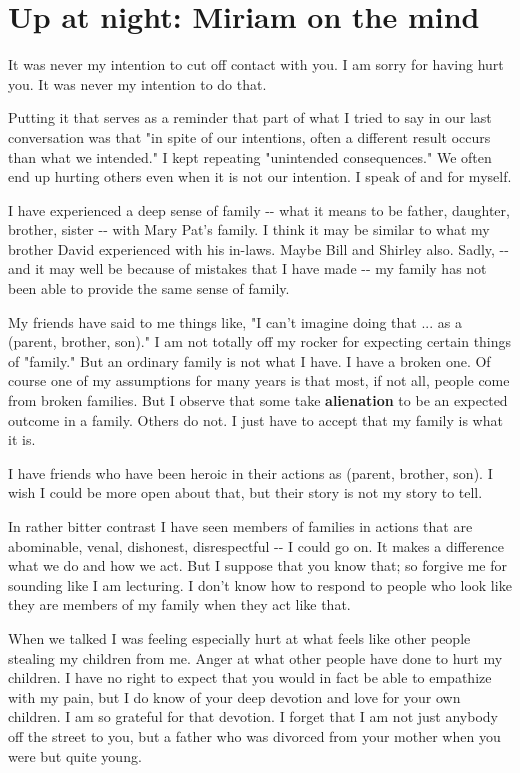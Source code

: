 \documentclass[]{article}
\date{}
\begin{document}
\hypertarget{Upux20atux20night:ux20Miriamux20onux20theux20mind}{%
\section{Up at night: Miriam on the
mind}\label{Upux20atux20night:ux20Miriamux20onux20theux20mind}}

It was never my intention to cut off contact with you. I am sorry for having hurt you. It was never my intention to do that.

Putting it that serves as a reminder that part of what I tried to say in our last conversation was that "in spite of our intentions, often a different result occurs than what we intended." I kept repeating "unintended consequences." We often end up hurting others even when it is not our intention. I speak of and for myself.

I have experienced a deep sense of family -\/- what it means to be father, daughter, brother, sister -\/- with Mary Pat's family. I think it may be similar to what my brother David experienced with his in-laws.  Maybe Bill and Shirley also. Sadly, -\/- and it may well be because of mistakes that I have made -\/- my family has not been able to provide the same sense of family.

My friends have said to me things like, "I can't imagine doing that ...  as a (parent, brother, son)." I am not totally off my rocker for expecting certain things of "family." But an ordinary family is not what I have. I have a broken one. Of course one of my assumptions for many years is that most, if not all, people come from broken families. But I observe that some take \protect\hypertarget{alienation}{}{}\textbf{alienation} to be an expected outcome in a family. Others do not. I just have to accept that my family is what it is.

I have friends who have been heroic in their actions as (parent, brother, son). I wish I could be more open about that, but their story is not my story to tell.

In rather bitter contrast I have seen members of families in actions that are abominable, venal, dishonest, disrespectful -\/- I could go on.  It makes a difference what we do and how we act. But I suppose that you know that; so forgive me for sounding like I am lecturing. I don't know how to respond to people who look like they are members of my family
when they act like that.

When we talked I was feeling especially hurt at what feels like other people stealing my children from me. Anger at what other people have done to hurt my children. I have no right to expect that you would in fact be able to empathize with my pain, but I do know of your deep devotion and love for your own children. I am so grateful for that devotion. I forget that I am not just anybody off the street to you, but a father who was divorced from your mother when you were but quite
young.
\end{document}

